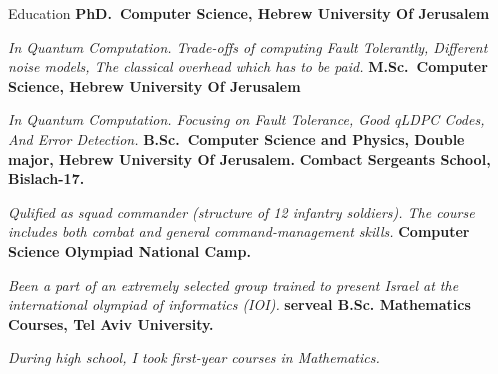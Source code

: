 \newcommand{\huji}{Hebrew University Of Jerusalem}
\begin{rubric}{Education}
  \entry*[2022 -- now]%
  \textbf{PhD.~Computer Science, \huji}\par
  \emph{In Quantum Computation. Trade-offs of computing Fault Tolerantly, Different noise models, The classical overhead which has to be paid.}
  \entry*[2021 -- 2022]%
  \textbf{M.Sc.~Computer Science, \huji}\par
  \emph{In Quantum Computation. Focusing on Fault Tolerance, Good qLDPC Codes, And Error Detection.}
  \entry*[2018 -- 2021]%
  \textbf{B.Sc.~Computer Science and Physics, Double major, \huji.}
  \entry*[2016]%
  \textbf{Combact Sergeants School, Bislach-17.}\par
  \emph{Qulified as squad commander (structure of 12 infantry soldiers). The course includes both combat and general command-management skills.}
  \entry*[2013 -- 2014]%
  \textbf{Computer Science Olympiad National Camp.}\par
  \emph{Been a part of an extremely selected group trained to present Israel at the international olympiad of informatics (IOI).}
  \entry*[2012 -- 2014]%
  \textbf{serveal B.Sc. Mathematics Courses, Tel Aviv University. }\par
  \emph{During high school, I took first-year courses in Mathematics.}
\end{rubric}
